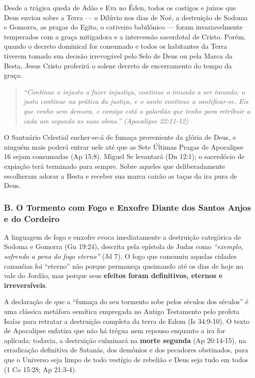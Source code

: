 Desde a trágica queda de Adão e Eva no Éden, todos os castigos e juízos que Deus enviou sobre a Terra — o Dilúvio nos dias de Noé, a destruição de Sodoma e Gomorra, as pragas do Egito, o cativeiro babilônico — foram invariavelmente temperados com a graça mitigadora e a intercessão sacerdotal de Cristo. Porém, quando o decreto dominical for consumado e todos os habitantes da Terra tiverem tomado sua decisão irrevogável pelo Selo de Deus ou pela Marca da Besta, Jesus Cristo proferirá o solene decreto de encerramento do tempo da graça:


\begin{quote}
\itshape \textit{``Continue o injusto a fazer injustiça, continue o imundo a ser imundo; o justo continue na prática da justiça, e o santo continue a santificar-se. Eis que venho sem demora, e comigo está o galardão que tenho para retribuir a cada um segundo as suas obras.''} (Apocalipse 22:11-12)
\end{quote}


O Santuário Celestial encher-se-á de fumaça proveniente da glória de Deus, e ninguém mais poderá entrar nele até que as Sete Últimas Pragas de Apocalipse 16 sejam consumadas (Ap 15:8). Miguel Se levantará (Dn 12:1); o sacerdócio de expiação terá terminado para sempre. Sobre aqueles que deliberadamente escolheram adorar a Besta e receber sua marca cairão as taças da ira pura de Deus.


\subsubsection*{B. O Tormento com Fogo e Enxofre Diante dos Santos Anjos e do Cordeiro}

A linguagem de fogo e enxofre evoca imediatamente a destruição categórica de Sodoma e Gomorra (Gn 19:24), descrita pela epístola de Judas como \textit{``exemplo, sofrendo a pena do fogo eterno''} (Jd 7). O fogo que consumiu aquelas cidades cananéias foi ``eterno'' não porque permaneça queimando até os dias de hoje no vale do Jordão, mas porque seus \textbf{efeitos foram definitivos, eternos e irreversíveis}.

A declaração de que a ``fumaça do seu tormento sobe pelos séculos dos séculos'' é uma clássica metáfora semítica empregada no Antigo Testamento pelo profeta Isaías para retratar a destruição completa da terra de Edom (Is 34:9-10). O texto de Apocalipse enfatiza que não há trégua nem repouso enquanto a ira for aplicada; todavia, a destruição culminará na \textbf{morte segunda} (Ap 20:14-15), na erradicação definitiva de Satanás, dos demônios e dos pecadores obstinados, para que o Universo seja limpo de todo vestígio de rebelião e Deus seja tudo em todos (1 Co 15:28; Ap 21:3-4).




